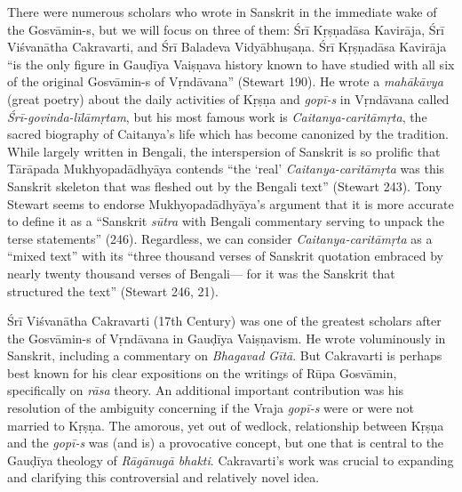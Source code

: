There were numerous scholars who wrote in Sanskrit in the immediate wake of the Gosvāmin-s, but we will focus on three of them: Śrī Kṛṣṇadāsa Kavirāja, Śrī Viśvanātha Cakravarti, and Śrī Baladeva Vidyābhuṣaṇa. Śrī Kṛṣṇadāsa Kavirāja “is the only figure in Gauḍīya Vaiṣṇava history known to have studied with all six of the original Gosvāmin-s of Vṛndāvana” (Stewart 190). He wrote a {\sl mahākāvya} (great poetry) about the daily activities of Kṛṣṇa and {\sl gopī-s} in Vṛndāvana called {\sl Śrī-govinda-līlāmṛtam}, but his most famous work is {\sl Caitanya-caritāmṛta}, the sacred biography of Caitanya’s life which has become canonized by the tradition. While largely written in Bengali, the interspersion of Sanskrit is so prolific that Tārāpada Mukhyopadādhyāya contends “the ‘real’ {\sl Caitanya-caritāmṛta} was this Sanskrit skeleton that was fleshed out by the Bengali text” (Stewart 243). Tony Stewart seems to endorse Mukhyopadādhyāya’s argument that it is more accurate to define it as a “Sanskrit {\sl sūtra} with Bengali commentary serving to unpack the terse statements” (246). Regardless, we can consider {\sl Caitanya-caritāmṛta} as a “mixed text” with its “three thousand verses of Sanskrit quotation embraced by nearly twenty thousand verses of Bengali— for it was the Sanskrit that structured the text” (Stewart 246, 21). 

Śrī Viśvanātha Cakravarti (17th Century) was one of the greatest scholars after the Gosvāmin-s of Vṛndāvana in Gauḍīya Vaiṣṇavism. He wrote voluminously in Sanskrit, including a commentary on {\sl Bhagavad Gītā}. But Cakravarti is perhaps best known for his clear expositions on the writings of Rūpa Gosvāmin, specifically on {\sl rāsa} theory. An additional important contribution was his resolution of the ambiguity concerning if the Vraja {\sl gopī-s} were or were not married to Kṛṣṇa. The amorous, yet out of wedlock, relationship between Kṛṣṇa and the {\sl gopī-s} was (and is) a provocative concept, but one that is central to the Gauḍīya theology of {\sl Rāgānugā bhakti}. Cakravarti’s work was crucial to expanding and clarifying this controversial and relatively novel idea. 

